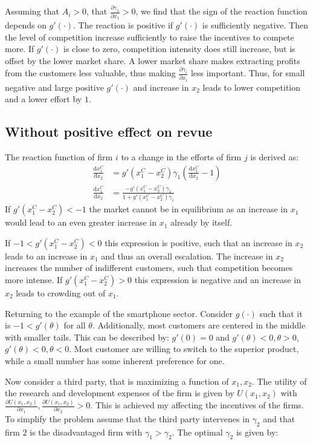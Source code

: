 \documentclass[a4paper, 11pt]{article}
\renewcommand{\d}{\text{d}}
\begin{document}
Assuming that $A_i>0$, that $\frac{\partial \gamma_1}{\partial x_1}>0$, we find that the sign of the reaction function depends on $g'(\cdot)$. The reaction is positive if $g'(\cdot)$ is sufficiently negative. Then the level of competition increase sufficiently to raise the incentives to compete more. If $g'(\cdot)$ is close to zero, competition intensity does still increase, but is offset by the lower market share. A lower market share makes extracting profits from the customers less valuable, thus making $\frac{\partial \gamma_i}{\partial x_i}$ less important. Thus, for small negative and large positive $g'(\cdot)$ and increase in $x_2$ leads to lower competition and a lower effort by $1$. 

\subsection{Without positive effect on revue}
The reaction function of firm $i$ to a change in the efforts of firm $j$ is derived as:
\begin{align}
\frac{\d x_1^C}{\d x_2} &= g'(x_1^C-x_2^C)\gamma_1\left(\frac{\d x_1^C}{\d x_2}-1\right)\\
\frac{\d x_1^C}{\d x_2} &= \frac{-g'(x_1^C-x_2^C)\gamma_1}{1+g'(x_1^C-x_2^C)\gamma_1}
\end{align}
If $g'(x_1^C-x_2^C)<-1$ the market cannot be in equilibrium as an increase in $x_1$ would lead to an even greater increase in $x_1$ already by itself.

If $-1<g'(x_1^C-x_2^C)<0$ this expression is positive, such that an increase in $x_2$ leads to an increase in $x_1$ and thus an overall escalation. The increase in $x_2$ increases the number of indifferent customers, such that competition becomes more intense. If $g'(x_1^C-x_2^C)>0$ this expression is negative and an increase in $x_2$ leads to crowding out of $x_1$. 

Returning to the example of the smartphone sector. Consider $g(\cdot)$ such that it is $-1<g'(\theta)$ for all $\theta$. Additionally, most customers are centered in the middle with smaller tails. This can be described by: $g'(0)=0$ and $g'(\theta)<0, \theta>0$,$g'(\theta)<0, \theta<0$. Most customer are willing to switch to the superior product, while a small number has some inherent preference for one.

Now consider a third party, that is maximizing a function of $x_1, x_2$. The utility of the research and development expenses of the firm is given by $U(x_1,x_2)$ with $\frac{\partial U(x_1,x_2)}{\partial x_1},\frac{\partial U(x_1,x_2)}{\partial x_2}>0$. This is achieved my affecting the incentives of the firms. To simplify the problem assume that the third party intervenes in $\gamma_2$ and that firm $2$ is the disadvantaged firm with $\gamma_1>\gamma_2$. The optimal $\gamma_2$ is given by:
\end{document}
